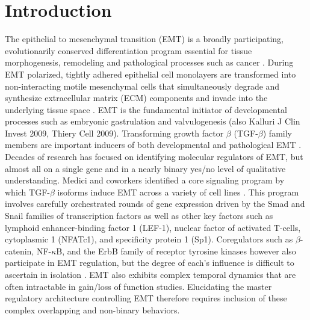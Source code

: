 \documentclass[11pt,letterpaper]{article}
\begin{document}
\section*{Introduction}
The epithelial to mesenchymal transition (EMT) is a broadly participating, evolutionarily conserved differentiation program essential for tissue morphogenesis, remodeling and pathological processes such as cancer \cite{Thiery:2003il}. During EMT polarized, tightly adhered epithelial cell monolayers are transformed into non-interacting motile mesenchymal cells that simultaneously degrade and synthesize extracellular matrix (ECM) components and invade into the underlying tissue space \cite{Stahl:2001pd}. EMT is the fundamental initiator of developmental processes such as embryonic gastrulation and valvulogenesis \cite{Eisenberg:1995ai} (also Kalluri J Clin Invest 2009, Thiery Cell 2009). Transforming growth factor $\beta$ (TGF-$\beta$) family members are important inducers of both developmental and pathological EMT \cite{Zavadil:2005fu,Xu:2009oq}. Decades of research has focused on identifying molecular regulators of EMT, but almost all on a single gene and in a nearly binary yes/no level of qualitative understanding. Medici and coworkers identified a core signaling program by which
TGF-$\beta$ isoforms induce EMT across a variety of cell lines \cite{Medici:2006qa,Medici:2008fk}.
This program involves carefully orchestrated rounds of gene expression driven by the Smad and Snail families of transcription factors as well as
other key factors such as lymphoid enhancer-binding factor 1 (LEF-1), nuclear factor of activated T-cells, cytoplasmic 1 (NFATc1), and specificity protein 1 (Sp1).
Coregulators such as $\beta$-catenin, NF-$\kappa$B, and the ErbB family of receptor tyrosine kinases however also participate in EMT regulation, but the degree of each's influence is difficult to ascertain in isolation \cite{Kim:2002lh,Jiang:2007aa,Huber:2004aa,Hardy:2010aa}.
EMT also exhibits complex temporal dynamics that are often intractable in gain/loss of function studies.
Elucidating the master regulatory architecture controlling EMT therefore requires inclusion of these complex overlapping and non-binary behaviors.
\end{document}
